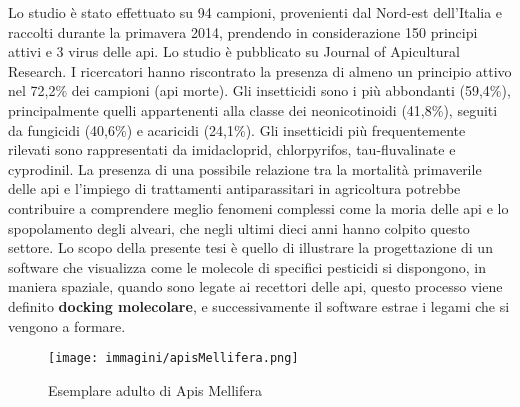 Lo studio è stato effettuato su 94 campioni, provenienti dal Nord-est dell’Italia e raccolti durante la primavera 2014, prendendo in considerazione 150 principi attivi e 3 virus delle api. Lo studio è pubblicato su Journal of Apicultural Research. I ricercatori hanno riscontrato la presenza di almeno un principio attivo nel 72,2\% dei campioni (api morte). Gli insetticidi sono i più abbondanti (59,4\%), principalmente quelli appartenenti alla classe dei neonicotinoidi (41,8\%), seguiti da fungicidi (40,6\%) e acaricidi (24,1\%). Gli insetticidi più frequentemente rilevati sono rappresentati da imidacloprid, chlorpyrifos, tau-fluvalinate e cyprodinil.\newline
La presenza di una possibile relazione tra la mortalità primaverile delle api e l’impiego di trattamenti antiparassitari in agricoltura potrebbe contribuire a comprendere meglio fenomeni complessi come la moria delle api e lo spopolamento degli alveari, che negli ultimi dieci anni hanno colpito questo settore\cite{martinello2017spring}.\newline
Lo scopo della presente tesi è quello di illustrare la progettazione di un software che visualizza come le molecole di specifici pesticidi si dispongono, in maniera spaziale, quando sono legate ai recettori delle api, questo processo viene definito \textbf{docking molecolare}, e successivamente il software estrae i legami che si vengono a formare.

\begin{figure}[H]
    \centering
    \texttt{[image: immagini/apisMellifera.png]}
    \caption{Esemplare adulto di Apis Mellifera}
    \label{fig:Apis Mellifera}
\end{figure}

